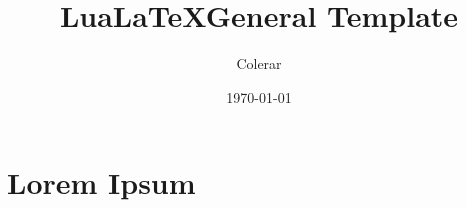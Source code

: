 \documentclass{report}
\author{Colerar}
\date{\today}
\title{Lua\LaTeX General Template}
\theoremstyle{definition}
\begin{document}
\maketitle

{
  \hypersetup{linkcolor=black}
  \tableofcontents
}


\newcommand{\ra}{\rightarrow}
\newcommand{\la}{\leftarrow}
\newcommand{\suchthat}{\textnormal{ such that }}
\newcommand{\for}{\textnormal{ for }}
\newcommand{\where}{\textnormal{ where }}
\newcommand{\by}{\textnormal{ by }}
\newcommand{\and}{\textnormal{ and }}

\newcommand{\R}{\mathbb{R}}
\newcommand{\Z}{\mathbb{Z}}
\newcommand{\N}{\mathbb{N}}
\newcommand{\Q}{\mathbb{Q}}
\newcommand{\M}{\mathbb{M}}
\newcommand{\C}{\mathbb{C}}
\newcommand{\F}{\mathbb{F}}

\renewcommand{\P}{\mathcal{P}}
\newcommand{\T}{\mathcal{T}}
\newcommand{\D}{\mathcal{D}}
\newcommand{\U}{\mathcal{U}}
\newcommand{\V}{\mathcal{V}}
\newcommand{\card}{\textnormal{card}}

\newcommand{\Mmn}{\M_{m,n}}
\newcommand{\FF}[2]{\F^{#1 \times #2}}
\newcommand{\RR}[2]{\R^{#1 \times #2}}
\newcommand{\CC}[2]{\C^{#1 \times #2}}
\newcommand{\seq}[1]{\{#1_i\}_{i=1}^{\infty}}
\newcommand{\trace}{\operatorname{tr}}
\newcommand{\rsa}{\rightsquigarrow}
\newcommand{\rank}{\operatorname{rank}}
\newcommand{\diag}{\operatorname{diag}}
\newcommand{\spann}[1]{\operatorname{span}(#1)}
\newcommand{\proj}{\operatorname{proj}}
\newcommand{\vol}{\operatorname{vol}}
\newcommand{\cis}{\operatorname{cis}}
\newcommand{\Sym}{\operatorname{Sym}}
\newcommand{\qedp}{\hfill $\square$}

\newcommand{\mat}[1]{\begin{bmatrix} #1 \end{bmatrix}}
\newcommand{\vmat}[1]{\begin{vmatrix} #1 \end{vmatrix}}
\newcommand{\pmat}[1]{\begin{pmatrix} #1 \end{pmatrix}}
\DeclarePairedDelimiter\ceil{\lceil}{\rceil}
\DeclarePairedDelimiter\floor{\lfloor}{\rfloor}

\renewcommand\labelenumi{(\theenumi)}
\renewcommand\qedsymbol{$\blacksquare$}


\chapter{Lorem Ipsum}
\end{document}
